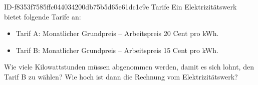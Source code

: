 \begin{exercise}
      {ID-f8353f7585ffc044034200db75b5d65e61dc1c9e}
      {Tarife}
  \ifproblem\problem
    Ein Elektrizitätswerk bietet folgende Tarife an:
    \begin{itemize}
      \item Tarif A: Monatlicher Grundpreis  -- Arbeitspreis 20 Cent pro kWh.
      \item Tarif B: Monatlicher Grundpreis  -- Arbeitspreis 15 Cent pro kWh.
    \end{itemize}
    Wie viele Kilowattstunden müssen abgenommen werden, damit es sich lohnt,
    den Tarif B zu wählen? Wie hoch ist dann die Rechnung vom Elektrizitätswerk?
  \fi
\end{exercise}
